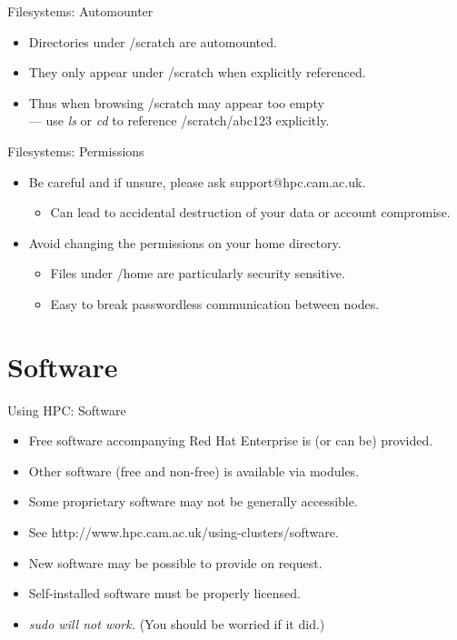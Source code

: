 \begin{frame}{Filesystems: Automounter}
\begin{itemize}
\item{Directories under /scratch are \alert{automounted}.}
\item{They only appear under /scratch when explicitly referenced.}
\item{Thus when browsing /scratch may appear too empty\hfill\\
\qquad\alert{--- use \emph{ls} or \emph{cd} to reference /scratch/abc123 explicitly.}}
\end{itemize}
\end{frame}

\begin{frame}{Filesystems: Permissions}
\begin{itemize}
\item{\color{red}Be careful and if unsure, please ask support@hpc.cam.ac.uk.}
\begin{itemize}
\item{Can lead to \alert{accidental destruction} of your data or \alert{account compromise}.}
\end{itemize}
\item{Avoid changing the permissions on your home directory.}
\begin{itemize}
\item{Files under /home are particularly security sensitive.}
\item{Easy to break passwordless communication between nodes.}
\end{itemize}
\end{itemize}
\end{frame}

\section{Software}
\begin{frame}{Using HPC: Software}
\begin{itemize}
\item{Free software accompanying \alert{Red Hat Enterprise} is (or can be) provided.}
\item{Other software (free and non-free) is available via \alert{modules}.}
\item{Some proprietary software may not be generally accessible.}
\item{See \alert{http://www.hpc.cam.ac.uk/using-clusters/software}.}
\item{New software may be possible to provide on request.}
\item{\alert{Self-installed software must be properly licensed.}}
  \pause
\item{\color{red}\emph{sudo will not work.}\/ (You should be worried if it did.)}
\end{itemize}
\end{frame}

